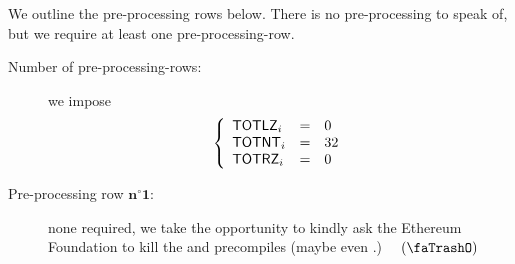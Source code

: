 \begin{center}
\end{center}
We outline the pre-processing rows below.
There is no pre-processing to speak of, but we require at least one pre-processing-row.
\begin{description}
	\item[Number of pre-processing-rows:]
		we impose
		\[
			\left\{ \begin{array}{lcl}
				\textsf{TOTLZ}    _{i}     & = & 0 \\ 
				\textsf{TOTNT}    _{i}     & = & 32 \\ 
				\textsf{TOTRZ}    _{i}     & = & 0 \\ 
			\end{array} \right.
		\]
	\item[Pre-processing row $\bm{n^\circ 1}$:] 
		none required, we take the opportunity to kindly ask the Ethereum Foundation to kill the  and  precompiles \faSmileO{} (maybe even .) $\quad(\trash)$
\end{description}
